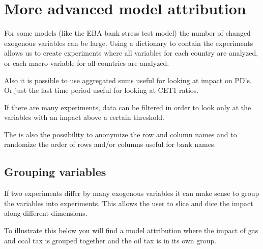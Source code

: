\documentclass[letterpaper,10pt,english]{jupyterBook}
\begin{document}
\section{More advanced model attribution}
\label{\detokenize{content/06_ModelAnalytics/Attribution:more-advanced-model-attribution}}
\sphinxAtStartPar
For some  models (like the EBA bank stress test model) the number of changed exogenous variables can be large. Using a dictionary to contain the experiments allows us to create experiments where all variables for each country are analyzed, or each macro variable for all countries are analyzed.

\sphinxAtStartPar
Also it is possible to use aggregated sums \sphinxhyphen{} useful for looking at impact on PD’s. Or just the last time period \sphinxhyphen{} useful for looking at CET1 ratios.

\sphinxAtStartPar
If there are many experiments, data can be filtered in order to look only at the variables with an impact above a certain threshold.

\sphinxAtStartPar
The is also the possibility to   anonymize  the row and column names and to randomize
the order of rows and/or columns \sphinxhyphen{} useful for bank names.


\subsection{Grouping variables}
\label{\detokenize{content/06_ModelAnalytics/Attribution:grouping-variables}}
\sphinxAtStartPar
If two experiments differ by many exogenous variables it can make sense to group the variables into experiments. This allows the user to
slice and dice the impact along different dimensions.

\sphinxAtStartPar
To illustrate this below you will find a model attribution where the impact of gas and coal tax is grouped together and the oil tax is in its own group.
\end{document}
